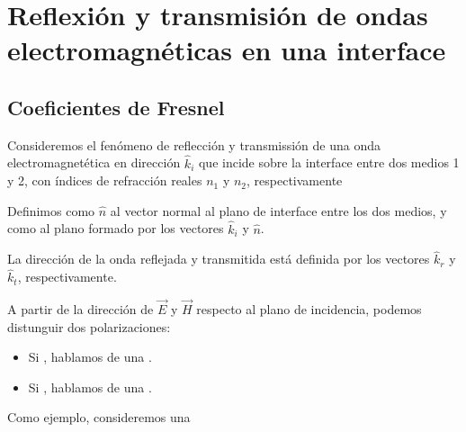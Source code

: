 \documentclass[letterpaper,10pt,english]{jupyterBook}
\let\sphinxpxdimen\pdfpxdimen\else\newdimen\sphinxpxdimen
\begin{document}
\section{Reflexión y transmisión de ondas electromagnéticas en una interface}
\label{\detokenize{2_ondas_EM_en_la_materia/2_ondas_EM_en_la_materia:reflexion-y-transmision-de-ondas-electromagneticas-en-una-interface}}

\subsection{Coeficientes de Fresnel}
\label{\detokenize{2_ondas_EM_en_la_materia/2_ondas_EM_en_la_materia:coeficientes-de-fresnel}}
\sphinxAtStartPar
Consideremos el fenómeno de reflección y transmissión de una onda electromagnetética en dirección \(\hat{k}_i\) que incide sobre la interface entre dos medios 1 y 2, con índices de refracción reales \(n_1\) y \(n_2\), respectivamente

\sphinxAtStartPar
Definimos como \(\hat{n}\) al vector normal al plano de interface entre los dos medios, y como  al plano formado por los vectores \(\hat{k}_i\) y \(\hat{n}\).

\sphinxAtStartPar
La dirección de la onda reflejada y transmitida está definida por los vectores \(\hat{k}_r\) y \(\hat{k}_t\), respectivamente.

\noindent{\hspace*{\fill}\sphinxincludegraphics[width=350\sphinxpxdimen]{{plano_incidencia}.png}\hspace*{\fill}}

\sphinxAtStartPar
A partir de la dirección de \(\vec{E}\) y \(\vec{H}\) respecto al plano de incidencia, podemos distunguir dos polarizaciones:
\begin{itemize}
\item {} 
\sphinxAtStartPar
Si , hablamos de una .

\item {} 
\sphinxAtStartPar
Si , hablamos de una .

\end{itemize}

\sphinxAtStartPar
Como ejemplo, consideremos una 
\end{document}
